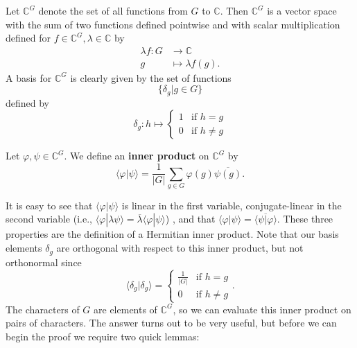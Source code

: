 \begin{defn}
Let $\mathbb{C}^G$ denote the set of all functions from $G$ to $\mathbb{C}$.  Then $\mathbb{C}^G$ is a vector space with the sum of two functions defined pointwise and with scalar multiplication defined for $f \in \mathbb{C}^G, \lambda \in \mathbb{C}$ by 
\begin{align*}
\lambda f \colon G &\to \mathbb{C} \\
g &\mapsto \lambda f(g).
\end{align*}
A basis for $\mathbb{C}^G$ is clearly given by the set of functions 
\[\{ \delta_g | g \in G  \} \]
defined by 
\[ \delta_g \colon h \mapsto \begin{cases}  1 &\text{if } h = g \\
 0 &\text{if } h \neq g
\end{cases} \]
\end{defn}

\begin{defn}
Let $\varphi, \psi \in \mathbb{C}^G$.  We define an \textbf{inner product}  on $\mathbb{C}^G$ by 
\[ \langle \varphi | \psi \rangle = \frac{1}{|G|} \sum_{g \in G} \varphi(g) \overline{\psi(g)}.\]
\end{defn}
It is easy to see that $\langle \varphi | \psi \rangle$ is linear in the first variable, conjugate-linear in the second variable (i.e., $\langle \varphi | \lambda \psi \rangle = \overline{\lambda}	\langle \varphi | \psi \rangle$) , and that $\langle \varphi | \psi \rangle = \overline {\langle \psi | \varphi \rangle}$.  These three properties are the definition of a Hermitian inner product.  Note that our basis elements $\delta_g$ are orthogonal with respect to this inner product, but not orthonormal since 
\[ \langle \delta_g | \delta_g \rangle = \begin{cases} \frac{1}{|G|} &\mbox{if } h = g \\ 0 &\mbox{if } h \neq g \end{cases}. \]
The characters of $G$ are elements of $\mathbb{C}^G$, so we can evaluate this inner product on pairs of characters.  The answer turns out to be very useful, but before we can begin the proof we require two quick lemmas:

